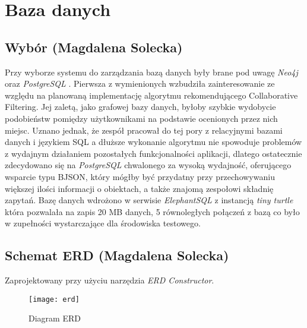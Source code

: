 \chapter{Baza danych}
\section{Wybór (Magdalena Solecka)}
\par Przy wyborze systemu do zarządzania bazą danych były brane pod uwagę \textit{Neo4j} \cite{Neo4j} oraz \textit{PostgreSQL} \cite{PostgreSQL}. Pierwsza z wymienionych wzbudziła zainteresowanie ze względu na planowaną implementację algorytmu rekomendującego Collaborative Filtering. Jej zaletą, jako grafowej bazy danych, byłoby szybkie wydobycie podobieństw pomiędzy użytkownikami na podstawie ocenionych przez nich miejsc. Uznano jednak, że zespół pracował do tej pory z relacyjnymi bazami danych i językiem SQL a dłuższe wykonanie algorytmu nie spowoduje problemów z wydajnym działaniem pozostałych funkcjonalności aplikacji, dlatego ostatecznie zdecydowano się na \textit{PostgreSQL} chwalonego za wysoką wydajność, oferującego wsparcie typu BJSON, który mógłby być przydatny przy  przechowywaniu większej ilości informacji o obiektach, a także znajomą zespołowi składnię zapytań. Bazę danych wdrożono w serwisie \textit{ElephantSQL} z instancją \textit{tiny turtle}
 która pozwalała na zapis 20 MB danych, 5 równoległych połączeń z bazą co było w zupełności wystarczające dla środowiska testowego.

\section{Schemat ERD (Magdalena Solecka)}
\par Zaprojektowany przy użyciu narzędzia \textit{ERD Constructor}.

\noindent\newline
\begin{figure}[h]
\centering
\texttt{[image: erd]}
\caption{Diagram ERD}
\label{fig:erd}
\end{figure}
\FloatBarrier

